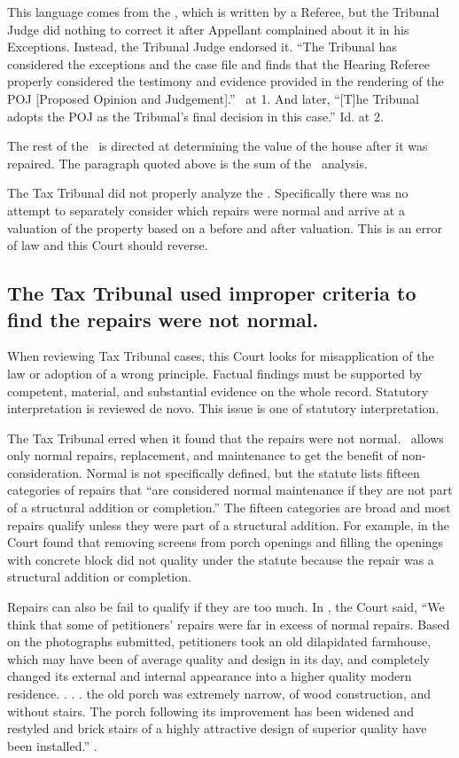 \documentclass[12pt,\documentclassflag]{michiganCourtOfAppealsBrief}
\def\mathieuGast{\pincite[l]{MCL}{211.27(2)}}
\begin{document}
This language comes from the \POJ, which is written by a Referee, but the Tribunal Judge did nothing to correct it after Appellant complained about it in his Exceptions. Instead, the Tribunal Judge endorsed it. ``The Tribunal has considered the exceptions and the case file and finds that the Hearing Referee properly considered the testimony and evidence provided in the rendering of the POJ [Proposed Opinion and Judgement].'' \FOJ\ at 1. And later, ``[T]he Tribunal adopts the POJ as the Tribunal's final decision in this case.'' Id. at 2.

The rest of the \POJ\ is directed at determining the value of the house after it was repaired. The paragraph quoted above is the sum of the \mathieuGast\ analysis.

The Tax Tribunal did not properly analyze the \mathieuGast. Specifically there was no attempt to separately consider which repairs were normal and arrive at a valuation of the property based on a before and after valuation. This is an error of law and this Court should reverse.

\subsection{The Tax Tribunal used improper criteria to find the repairs were not normal.}

When reviewing Tax Tribunal cases, this Court looks for misapplication of the law or adoption of a wrong principle. Factual findings must be supported by competent, material, and substantial evidence on the whole record. Statutory interpretation is reviewed de novo.  This issue is one of statutory interpretation.

The Tax Tribunal erred when it found that the repairs were not normal. \mathieuGast\ allows only normal repairs, replacement, and maintenance to get the benefit of non-consideration. Normal is not specifically defined, but the statute lists fifteen categories of repairs that ``are considered normal maintenance if they are not part of a structural addition or completion.'' The fifteen categories are broad and most repairs qualify unless they were part of a structural addition. For example, in \cite{Coyne} the Court found that removing screens from porch openings and filling the openings with concrete block did not quality under the statute because the repair was a structural addition or completion.

  Repairs can also be fail to qualify if they are too much. In \cite{Fisher}, the Court said, ``We think that some of petitioners' repairs were far in excess of normal repairs. Based on the photographs submitted, petitioners took an old dilapidated farmhouse, which may have been of average quality and design in its day, and completely changed its external and internal appearance into a higher quality modern residence. . . . the old porch was extremely narrow, of wood construction, and without stairs. The porch following its improvement has been widened and restyled and brick stairs of a highly attractive design of superior quality have been installed.'' .
\end{document}
